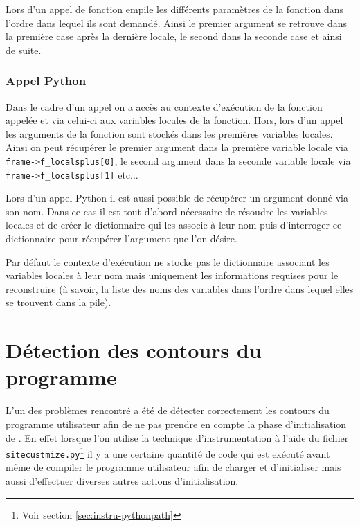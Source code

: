 \begin{note}
Lors d'un appel de fonction \Python empile les différents paramètres de la fonction dans l'ordre dans lequel ils sont demandé. Ainsi le premier argument se retrouve dans la première case après la dernière locale, le second dans la seconde case et ainsi de suite.
\end{note}

\subsubsection*{Appel Python}
Dans le cadre d'un appel \Python on a accès au contexte d'exécution de la fonction appelée et via celui-ci aux variables locales de la fonction. Hors, lors d'un appel \Python les arguments de la fonction sont stockés dans les premières variables locales. Ainsi on peut récupérer le premier argument dans la première variable locale via \verb|frame->f_localsplus[0]|, le second argument dans la seconde variable locale via \verb|frame->f_localsplus[1]| etc...

Lors d'un appel Python il est aussi possible de récupérer un argument donné via son nom. Dans ce cas il est tout d'abord nécessaire de résoudre les variables locales et de créer le dictionnaire qui les associe à leur nom puis d'interroger ce dictionnaire pour récupérer l'argument que l'on désire.

\begin{note}
Par défaut le contexte d'exécution ne stocke pas le dictionnaire associant les variables locales à leur nom mais uniquement les informations requises pour le reconstruire (à savoir, la liste des noms des variables dans l'ordre dans lequel elles se trouvent dans la pile).
\end{note}

  \section{Détection des contours du programme}

L'un des problèmes rencontré a été de détecter correctement les contours du programme utilisateur afin de ne pas prendre en compte la phase d'initialisation de \Blackfire. En effet lorsque l'on utilise la technique d'instrumentation à l'aide du fichier \verb|sitecustmize.py|\footnote{Voir section \vref{sec:instru-pythonpath}} il y a une certaine quantité de code qui est exécuté avant même de compiler le programme utilisateur afin de charger et d'initialiser \Blackfire mais aussi d'effectuer diverses autres actions d'initialisation.

